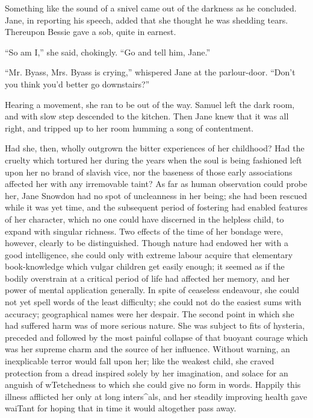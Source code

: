 Something like the sound of a snivel came out of the darkness as he
concluded. Jane, in reporting his speech, added that she thought he was
shedding tears. Thereupon Bessie gave a sob, quite in earnest.

``So am I,'' she said, chokingly. ``Go and tell him, Jane.''

``Mr. Byass, Mrs. Byass is crying,'' whispered Jane at the parlour-door.
``Don't you think you'd better go downstairs?''

Hearing a movement, she ran to be out of the way. Samuel left the dark
room, and with slow step descended to the kitchen. Then Jane knew that
it was all right, and {}tripped up to her room humming a song of
contentment.

Had she, then, wholly outgrown the bitter experiences of her childhood?
Had the cruelty which tortured her during the years when the soul is
being fashioned left upon her no brand of slavish vice, nor the baseness
of those early associations affected her with any irremovable taint? As
far as human observation could probe her, Jane Snowdon had no spot of
uncleanness in her being; she had been rescued while it was yet time,
and the subsequent period of fostering had enabled features of her
character, which no one could have discerned in the helpless child, to
expand with singular richness. Two effects of the time of her bondage
were, however, clearly to be distinguished. Though nature had endowed
her with a good intelligence, she could only with extreme labour acquire
that elementary book-knowledge which vulgar children get easily enough;
it seemed as if the bodily overstrain at a critical period of life had
affected her memory, and her power of mental application {}generally. In
spite of ceaseless endeavour, she could not yet spell words of the least
difficulty; she could not do the easiest sums with accuracy;
geographical names were her despair. The second point in which she had
suffered harm was of more serious nature. She was subject to fits of
hysteria, preceded and followed by the most painful collapse of that
buoyant courage which was her supreme charm and the source of her
influence. Without warning, an inexplicable terror would fall upon her;
like the weakest child, she craved protection from a dread inspired
solely by her imagination, and solace for an anguish of wTetchedness to
which she could give no form in words. Happily this illness afflicted
her only at long inters\^{}als, and her steadily improving health gave
waiTant for hoping that in time it would altogether pass away.

